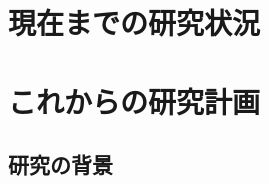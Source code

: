 \documentclass[11pt,a4paper,twoside,dvipdfmx]{jarticle}		%
\newcommand{\研究課題名}{象の卵}
\newcommand{\研究機関名}{逢坂大学}
\newcommand{\申請者氏名}{湯川秀樹}
\newcommand{\研究代表者氏名}{\申請者氏名}
\newcommand{\研究期間の最終元号年度}{34}	%
\begin{document}

\section{現在までの研究状況}
\newcommand{\現在までの研究状況}{%
	今までは、地球上で最大の生物、シロナガスクジラの卵の研究を進めようとしてきた。
	クジラの卵の場合は、高い水圧に耐える必要があるため、堅固の構造となっているはずであり、
	これが解明されれば、将来、深海潜水艇への応用も効く。
	しかし、シロナガスクジラの生息範囲が広い、海に潜っている時間が長い、
	生息数も減っている、などの原因により、
	卵を見つけることができなかった。
	
	そこで、\underline{地球で}最大の動物から、\underline{地上で}最大の動物に研究対象を変更する。

}

\section{これからの研究計画}
\subsection{研究の背景}
\newcommand{\研究の背景}{%
	寺村輝夫の研究\cite{teramuraKing}によれば、昔、
	王子の誕生を祝って国民全員に卵焼きを提供すべく、
	軍隊を動員して象の卵を探させた王がいた。
	このときは孵化直後の子象は見つかったが、それが入っていた殻の発見には至っていない。
	人の家の裏庭の犬小屋を衛星写真で調べることさえもできなかった時代とあっては、
	この失敗も無理からぬことである。
	
	\begin{thebibliography}{99}
		\bibitem{teramuraKing} 寺村輝夫、「ぼくは王様 - ぞうのたまごのたまごやき」.
	\end{thebibliography}
}
\end{document}
